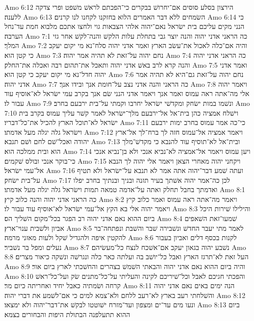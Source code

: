 Amo 6:12  הירצון בסלע סוסים אם־יחרושׁ בבקרים כי־הפכתם לראשׁ משׁפט ופרי צדקה ללענה׃
Amo 6:13  השׂמחים ללא דבר האמרים הלוא בחזקנו לקחנו לנו קרנים׃
Amo 6:14  כי הנני מקים עליכם בית ישׂראל נאם־יהוה אלהי הצבאות גוי ולחצו אתכם מלבוא חמת עד־נחל הערבה׃
Amo 7:1  כה הראני אדני יהוה והנה יוצר גבי בתחלת עלות הלקשׁ והנה־לקשׁ אחר גזי המלך׃
Amo 7:2  והיה אם־כלה לאכול את־עשׂב הארץ ואמר אדני יהוה סלח־נא מי יקום יעקב כי קטן הוא׃
Amo 7:3  נחם יהוה על־זאת לא תהיה אמר יהוה׃
Amo 7:4  כה הראני אדני יהוה והנה קרא לרב באשׁ אדני יהוה ותאכל את־תהום רבה ואכלה את־החלק׃
Amo 7:5  ואמר אדני יהוה חדל־נא מי יקום יעקב כי קטן הוא׃
Amo 7:6  נחם יהוה על־זאת גם־היא לא תהיה אמר אדני יהוה׃
Amo 7:7  כה הראני והנה אדני נצב על־חומת אנך ובידו אנך׃
Amo 7:8  ויאמר יהוה אלי מה־אתה ראה עמוס ואמר אנך ויאמר אדני הנני שׂם אנך בקרב עמי ישׂראל לא־אוסיף עוד עבור לו׃
Amo 7:9  ונשׁמו במות ישׂחק ומקדשׁי ישׂראל יחרבו וקמתי על־בית ירבעם בחרב׃
Amo 7:10  וישׁלח אמציה כהן בית־אל אל־ירבעם מלך־ישׂראל לאמר קשׁר עליך עמוס בקרב בית ישׂראל לא־תוכל הארץ להכיל את־כל־דבריו׃
Amo 7:11  כי־כה אמר עמוס בחרב ימות ירבעם וישׂראל גלה יגלה מעל אדמתו׃
Amo 7:12  ויאמר אמציה אל־עמוס חזה לך ברח־לך אל־ארץ יהודה ואכל־שׁם לחם ושׁם תנבא׃
Amo 7:13  ובית־אל לא־תוסיף עוד להנבא כי מקדשׁ־מלך הוא ובית ממלכה הוא׃
Amo 7:14  ויען עמוס ויאמר אל־אמציה לא־נביא אנכי ולא בן־נביא אנכי כי־בוקר אנכי ובולס שׁקמים׃
Amo 7:15  ויקחני יהוה מאחרי הצאן ויאמר אלי יהוה לך הנבא אל־עמי ישׂראל׃
Amo 7:16  ועתה שׁמע דבר־יהוה אתה אמר לא תנבא על־ישׂראל ולא תטיף על־בית ישׂחק׃
Amo 7:17  לכן כה־אמר יהוה אשׁתך בעיר תזנה ובניך ובנתיך בחרב יפלו ואדמתך בחבל תחלק ואתה על־אדמה טמאה תמות וישׂראל גלה יגלה מעל אדמתו׃
Amo 8:1  כה הראני אדני יהוה והנה כלוב קיץ׃
Amo 8:2  ויאמר מה־אתה ראה עמוס ואמר כלוב קיץ ויאמר יהוה אלי בא הקץ אל־עמי ישׂראל לא־אוסיף עוד עבור לו׃
Amo 8:3  והילילו שׁירות היכל ביום ההוא נאם אדני יהוה רב הפגר בכל־מקום השׁליך הס׃
Amo 8:4  שׁמעו־זאת השׁאפים אביון ולשׁבית ענוי־ארץ׃
Amo 8:5  לאמר מתי יעבר החדשׁ ונשׁבירה שׁבר והשׁבת ונפתחה־בר להקטין איפה ולהגדיל שׁקל ולעות מאזני מרמה׃
Amo 8:6  לקנות בכסף דלים ואביון בעבור נעלים ומפל בר נשׁביר׃
Amo 8:7  נשׁבע יהוה בגאון יעקב אם־אשׁכח לנצח כל־מעשׂיהם׃
Amo 8:8  העל זאת לא־תרגז הארץ ואבל כל־יושׁב בה ועלתה כאר כלה ונגרשׁה ונשׁקה כיאור מצרים׃
Amo 8:9  והיה ביום ההוא נאם אדני יהוה והבאתי השׁמשׁ בצהרים והחשׁכתי לארץ ביום אור׃
Amo 8:10  והפכתי חגיכם לאבל וכל־שׁיריכם לקינה והעליתי על־כל־מתנים שׂק ועל־כל־ראשׁ קרחה ושׂמתיה כאבל יחיד ואחריתה כיום מר׃
Amo 8:11  הנה ימים באים נאם אדני יהוה והשׁלחתי רעב בארץ לא־רעב ללחם ולא־צמא למים כי אם־לשׁמע את דברי יהוה׃
Amo 8:12  ונעו מים עד־ים ומצפון ועד־מזרח ישׁוטטו לבקשׁ את־דבר־יהוה ולא ימצאו׃
Amo 8:13  ביום ההוא תתעלפנה הבתולת היפות והבחורים בצמא׃
